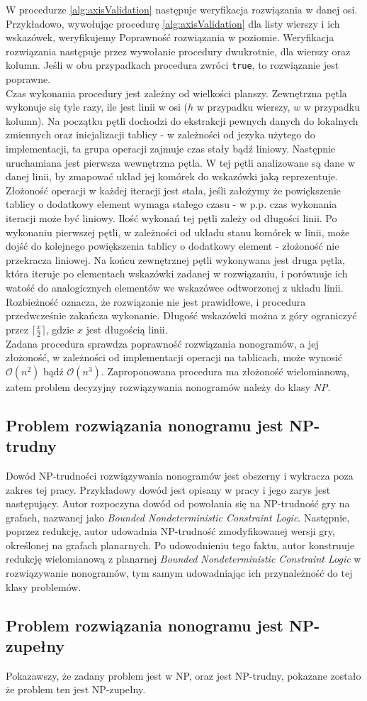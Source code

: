     W procedurze \ref{alg:axisValidation} następuje weryfikacja rozwiązania w danej osi. Przykładowo,
wywołując procedurę \ref{alg:axisValidation} dla listy wierszy i ich wskazówek, weryfikujemy Poprawność
rozwiązania w poziomie. Weryfikacja rozwiązania następuje przez wywołanie procedury dwukrotnie,
dla wierszy oraz kolumn. Jeśli w obu przypadkach procedura zwróci \texttt{true}, to rozwiązanie jest poprawne.\\
    Czas wykonania procedury jest zależny od wielkości planszy. Zewnętrzna pętla wykonuje się
tyle razy, ile jest linii w osi ($h$ w przypadku wierszy, $w$ w przypadku kolumn). Na początku pętli
dochodzi do ekstrakcji pewnych danych do lokalnych zmiennych oraz inicjalizacji tablicy - w zależności
od jezyka użytego do implementacji, ta grupa operacji zajmuje czas stały bądź liniowy. Następnie
uruchamiana jest pierwsza wewnętrzna pętla. W tej pętli analizowane są dane w danej linii, by zmapować
układ jej komórek do wskazówki jaką reprezentuje. Złożoność operacji w każdej iteracji jest stała,
jeśli założymy że powiększenie tablicy o dodatkowy element wymaga stałego czasu - w p.p. czas wykonania
iteracji może być liniowy. Ilość wykonań tej pętli zależy od długości linii.
Po wykonaniu pierwszej pętli, w zależności od układu stanu komórek w linii,
może dojść do kolejnego powiększenia tablicy o dodatkowy element - złożoność nie przekracza liniowej.
Na końcu zewnętrznej pętli wykonywana jest druga pętla, która iteruje po elementach wskazówki zadanej
w rozwiązaniu, i porównuje ich watość do analogicznych elementów we wskazówce odtworzonej z układu linii.
Rozbieżność oznacza, że rozwiązanie nie jest prawidłowe, i procedura przedwcześnie zakańcza wykonanie.
Długość wskazówki można z góry ograniczyć przez $\lceil \frac{x}{2} \rceil$, gdzie $x$ jest długością
linii.\\
    Zadana procedura sprawdza poprawność rozwiązania nonogramów, a jej złożoność, w zależności od
implementacji operacji na tablicach, może wynosić $\mathcal{O}(n^2)$ bądź $\mathcal{O}(n^3)$.
Zaproponowana procedura ma złożoność wielomianową, zatem problem decyzyjny rozwiązywania nonogramów
należy do klasy \textit{NP}.

\subsection{Problem rozwiązania nonogramu jest NP-trudny}
    Dowód NP-trudności rozwiązywania nonogramów jest obszerny i wykracza poza zakres tej pracy.
Przykładowy dowód jest opisany w pracy \cite{Nonograms-NP-Hard} i jego zarys jest następujący.
Autor rozpoczyna dowód od powołania się na NP-trudność gry na grafach, nazwanej jako
\textit{Bounded Nondeterministic Constraint Logic}. Następnie, poprzez redukcję, autor udowadnia 
NP-trudność zmodyfikowanej wersji gry, określonej na grafach planarnych. Po udowodnieniu tego faktu,
autor konstruuje redukcję wielomianową z planarnej \textit{Bounded Nondeterministic Constraint Logic}
w rozwiązywanie nonogramów, tym samym udowadniając ich przynależność do tej klasy problemów.

\subsection{Problem rozwiązania nonogramu jest NP-zupełny}
    Pokazawszy, że zadany problem jest w NP, oraz jest NP-trudny, pokazane zostało że problem ten
jest NP-zupełny.
